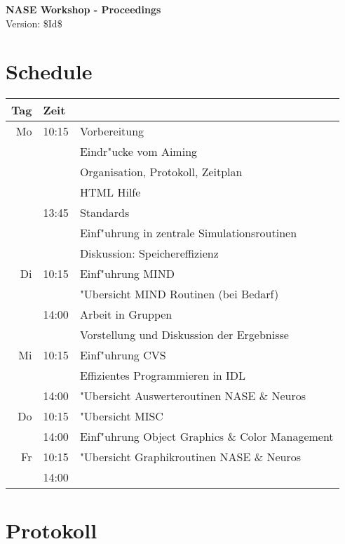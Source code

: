 \documentclass[12pt]{article}
\begin{document}
\begin{center}
{\Huge\textbf{NASE Workshop - Proceedings}}\\[2cm]
Version: \$Id$ $\$ 
\end{center}


\section{Schedule}

\begin{center}
\begin{tabular}{|r|l|l|}  \hline
  Tag & Zeit  & \\ 
\hline\hline
  Mo & 10:15 & Vorbereitung\\
     &       & Eindr"ucke vom Aiming\\
     &       & Organisation, Protokoll, Zeitplan\\
     &       & HTML Hilfe\\
     & 13:45 & Standards\\
     &       & Einf"uhrung in zentrale Simulationsroutinen\\
     &       & Diskussion: Speichereffizienz\\
\hline\hline
  Di & 10:15 & Einf"uhrung MIND\\ 
     &       & "Ubersicht MIND Routinen (bei Bedarf)\\ 
     & 14:00 & Arbeit in Gruppen\\ 
     &       & Vorstellung und Diskussion der Ergebnisse\\
\hline\hline
  Mi & 10:15 & Einf"uhrung CVS\\
     &       & Effizientes Programmieren in IDL\\
     & 14:00 & "Ubersicht Auswerteroutinen NASE \& Neuros\\
\hline\hline
  Do & 10:15 & "Ubersicht MISC \\
     & 14:00 & Einf"uhrung Object Graphics \& Color Management \\ \hline\hline
  Fr & 10:15 & "Ubersicht Graphikroutinen NASE \& Neuros\\
     & 14:00 &  \\ \hline
\end{tabular}

\end{center}



\section{Protokoll}
\end{document}
